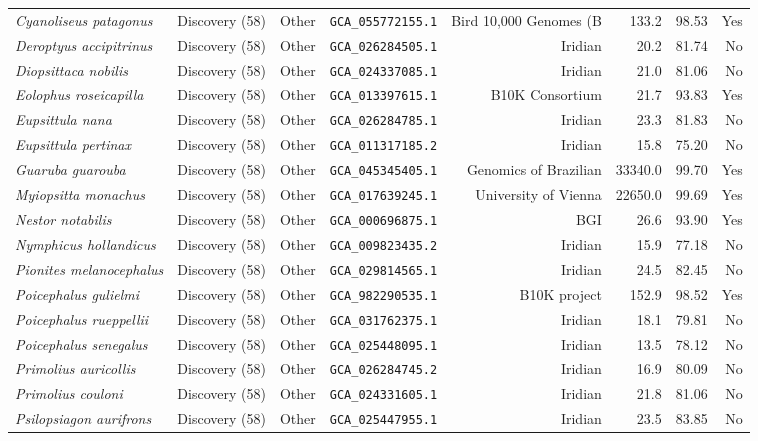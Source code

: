 \documentclass[9pt,a4paper]{article}
\begin{document}
\begin{longtable}{llllrrrr}
\textit{Cyanoliseus patagonus} & Discovery (58) & Other & \texttt{GCA\_055772155.1} & Bird 10,000 Genomes (B & 133.2 & 98.53 & Yes \\
\textit{Deroptyus accipitrinus} & Discovery (58) & Other & \texttt{GCA\_026284505.1} & Iridian & 20.2 & 81.74 & No \\
\textit{Diopsittaca nobilis} & Discovery (58) & Other & \texttt{GCA\_024337085.1} & Iridian & 21.0 & 81.06 & No \\
\textit{Eolophus roseicapilla} & Discovery (58) & Other & \texttt{GCA\_013397615.1} & B10K Consortium & 21.7 & 93.83 & Yes \\
\textit{Eupsittula nana} & Discovery (58) & Other & \texttt{GCA\_026284785.1} & Iridian & 23.3 & 81.83 & No \\
\textit{Eupsittula pertinax} & Discovery (58) & Other & \texttt{GCA\_011317185.2} & Iridian & 15.8 & 75.20 & No \\
\textit{Guaruba guarouba} & Discovery (58) & Other & \texttt{GCA\_045345405.1} & Genomics of Brazilian  & 33340.0 & 99.70 & Yes \\
\textit{Myiopsitta monachus} & Discovery (58) & Other & \texttt{GCA\_017639245.1} & University of Vienna & 22650.0 & 99.69 & Yes \\
\textit{Nestor notabilis} & Discovery (58) & Other & \texttt{GCA\_000696875.1} & BGI & 26.6 & 93.90 & Yes \\
\textit{Nymphicus hollandicus} & Discovery (58) & Other & \texttt{GCA\_009823435.2} & Iridian & 15.9 & 77.18 & No \\
\textit{Pionites melanocephalus} & Discovery (58) & Other & \texttt{GCA\_029814565.1} & Iridian & 24.5 & 82.45 & No \\
\textit{Poicephalus gulielmi} & Discovery (58) & Other & \texttt{GCA\_982290535.1} & B10K project & 152.9 & 98.52 & Yes \\
\textit{Poicephalus rueppellii} & Discovery (58) & Other & \texttt{GCA\_031762375.1} & Iridian & 18.1 & 79.81 & No \\
\textit{Poicephalus senegalus} & Discovery (58) & Other & \texttt{GCA\_025448095.1} & Iridian & 13.5 & 78.12 & No \\
\textit{Primolius auricollis} & Discovery (58) & Other & \texttt{GCA\_026284745.2} & Iridian & 16.9 & 80.09 & No \\
\textit{Primolius couloni} & Discovery (58) & Other & \texttt{GCA\_024331605.1} & Iridian & 21.8 & 81.06 & No \\
\textit{Psilopsiagon aurifrons} & Discovery (58) & Other & \texttt{GCA\_025447955.1} & Iridian & 23.5 & 83.85 & No \\

\end{longtable}
\end{document}
